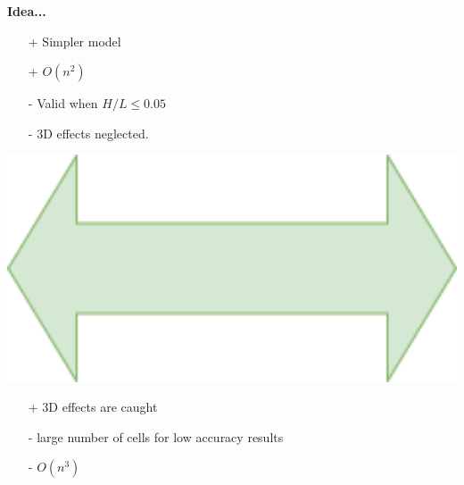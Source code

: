
\begin{frame}
{\Large \textbf{Idea...}}\\[1.5cm]
\hspace{1cm}
\begin{minipage}{0.35\textwidth}
\begin{tcolorbox}[
colframe=TUMDarkBlue,
title = \centering SWE\\2D] 
\begin{itemize}
\setlength\itemsep{1em}
\item[+] Simpler model 
\item[+] $O(n^2)$
\item[-] Valid when $H/L \leq 0.05$ %
\item[-] 3D effects neglected. \vspace{0.5cm}
\end{itemize}
\end{tcolorbox}    
\end{minipage}
\begin{minipage}{0.15\textwidth}
\hspace{0.5cm}
\includegraphics[width=1\textwidth]{Resources/Images/arrow2.png}\\
\end{minipage}
\begin{minipage}{0.35\textwidth}
\begin{tcolorbox} [
colframe=TUMOrange,
title = \centering Navier-Stokes\\3D]     
\begin{itemize}
\setlength\itemsep{1em}
\item[+] 3D effects are caught
\item[-] large number of cells for low accuracy results
\item[-] $O(n^3)$\vspace{0.6cm}
\end{itemize}
\end{tcolorbox}    
\end{minipage}



\end{frame}

